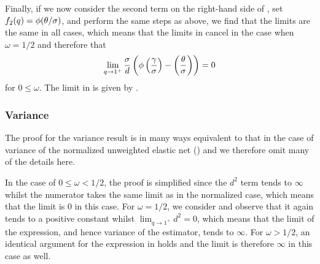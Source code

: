 Finally, if we now consider the second term on the right-hand side of
, set \(f_2(q) = \operatorname{\phi}(\theta/\sigma)\), and perform the
same steps as above, we find that the limits are the same in all cases, which means that
the limits in  cancel in the case when \(\omega = 1/2\)
and therefore that
\[
  \lim_{q \rightarrow 1^+} \frac{\sigma}{d} \left(\operatorname{\phi}\left(\frac{\gamma}{\sigma}\right) - \left(\frac{\theta}{\sigma}\right)\right) = 0
\]
for \(0 \leq \omega \). The limit in  is given by
.

\subsubsection{Variance}

The proof for the variance result is in many ways equivalent to that in the case of
variance of the normalized unweighted elastic net ()
and we therefore omit many of the details here.

In the case of \(0 \leq \omega < 1/2\), the proof is simplified since the \(d^2\) term
tends to \(\infty\) whilst the numerator takes the same limit as in the normalized case,
which means that the limit is \(0\) in this case. For \(\omega = 1/2\), we consider
 and observe that it again tends to a positive constant
whilst \(\lim_{q\rightarrow 1^+} d^2 = 0\), which means that the limit of the expression,
and hence variance of the estimator, tends to \(\infty\). For \(\omega > 1/2\), an
identical argument for the expression in  holds and the
limit is therefore \(\infty\) in this case as well.


